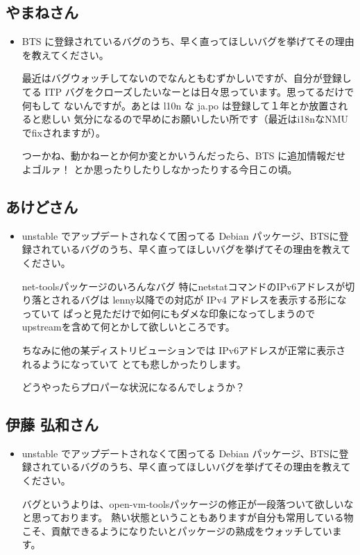 \documentclass[mingoth,a4paper]{jsarticle}
\begin{document}
\subsection{やまねさん}
\begin{itemize}
\item BTS に登録されているバグのうち、早く直ってほしいバグを挙げてその理由を教えてください。

最近はバグウォッチしてないのでなんともむずかしいですが、自分が登録してる
ITP バグをクローズしたいなーとは日々思っています。思ってるだけで何もして
ないんですが。あとは l10n な ja.po は登録して１年とか放置されると悲しい
気分になるので早めにお願いしたい所です（最近はi18nなNMUでfixされますが）。

つーかね、動かねーとか何か変とかいうんだったら、BTS に追加情報だせよゴルァ！
とか思ったりしたりしなかったりする今日この頃。
\end{itemize}

\subsection{あけどさん}
\begin{itemize}
\item unstable でアップデートされなくて困ってる Debian パッケージ、BTSに登録されているバグのうち、早く直ってほしいバグを挙げてその理由を教えてください。

net-toolsパッケージのいろんなバグ
特にnetstatコマンドのIPv6アドレスが切り落とされるバグは
lenny以降での対応が IPv4 アドレスを表示する形になっていて
ぱっと見ただけで如何にもダメな印象になってしまうので
upstreamを含めて何とかして欲しいところです。

ちなみに他の某ディストリビューションでは
IPv6アドレスが正常に表示されるようになっていて
とても悲しかったりします。

どうやったらプロパーな状況になるんでしょうか？
\end{itemize}

\subsection{伊藤 弘和さん}
\begin{itemize}
\item unstable でアップデートされなくて困ってる Debian パッケージ、BTSに登録されているバグのうち、早く直ってほしいバグを挙げてその理由を教えてください。

バグというよりは、open-vm-toolsパッケージの修正が一段落ついて欲しいなと思っております。
熱い状態ということもありますが自分も常用している物こそ、貢献できるようになりたいとパッケージの熟成をウォッチしています。
\end{itemize}
\end{document}
